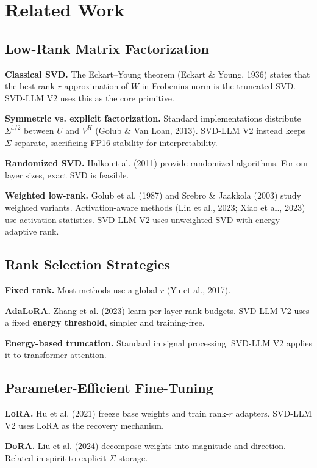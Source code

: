 
\section{Related Work}

\subsection{Low-Rank Matrix Factorization}

\textbf{Classical SVD.} The Eckart--Young theorem (Eckart \& Young, 1936) states 
that the best rank-$r$ approximation of $W$ in Frobenius norm is the 
truncated SVD. SVD-LLM V2 uses this as the core primitive.

\textbf{Symmetric vs. explicit factorization.} Standard implementations distribute 
$\Sigma^{1/2}$ between $U$ and $V^H$ (Golub \& Van Loan, 2013). SVD-LLM V2 
instead keeps $\Sigma$ separate, sacrificing FP16 stability for 
interpretability.

\textbf{Randomized SVD.} Halko et al. (2011) provide randomized algorithms. For 
our layer sizes, exact SVD is feasible.

\textbf{Weighted low-rank.} Golub et al. (1987) and Srebro \& Jaakkola (2003) study 
weighted variants. Activation-aware methods (Lin et al., 2023; Xiao et al., 
2023) use activation statistics. SVD-LLM V2 uses unweighted SVD with 
energy-adaptive rank.

\subsection{Rank Selection Strategies}

\textbf{Fixed rank.} Most methods use a global $r$ (Yu et al., 2017).

\textbf{AdaLoRA.} Zhang et al. (2023) learn per-layer rank budgets. SVD-LLM V2 
uses a fixed \textbf{energy threshold}, simpler and training-free.

\textbf{Energy-based truncation.} Standard in signal processing. SVD-LLM V2 
applies it to transformer attention.

\subsection{Parameter-Efficient Fine-Tuning}

\textbf{LoRA.} Hu et al. (2021) freeze base weights and train rank-$r$ adapters. 
SVD-LLM V2 uses LoRA as the recovery mechanism.

\textbf{DoRA.} Liu et al. (2024) decompose weights into magnitude and direction. 
Related in spirit to explicit $\Sigma$ storage.

